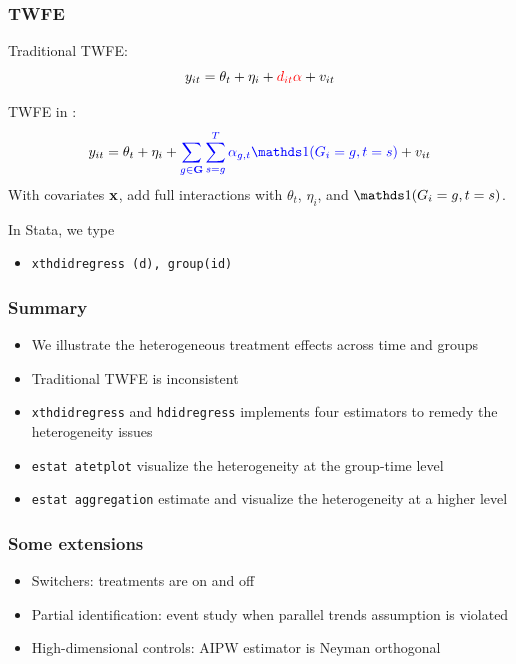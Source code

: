 \documentclass[11pt]{beamer}
\begin{document}
\begin{frame}
  \frametitle{TWFE}
Traditional TWFE:
$$
y_{it} = \theta_t + \eta_i +  {\color{red}{d_{it} \alpha}} + v_{it}
$$


\vskip 1cm
TWFE in \cite{Wooldridge2021}:
$$
	y_{it} = \theta_t + \eta_i +
	\myblue{\sum_{g\in\G}\sum_{s=g}^T\alpha_{g,t} \I(G_i = g, t = s)}
	+ v_{it}
$$
With covariates $\mathbf{x}$, add full interactions with $\theta_t$, $\eta_i$, and
$\I(G_i =g, t= s)$. 

\vskip 0.5cm
In Stata, we type
\begin{itemize}
\item {\large \tt xthdidregress  
  (d), group(id)}
\end{itemize}
\end{frame}

\begin{frame}
\frametitle{Summary}
\begin{itemize}
    \setlength\itemsep{1em}
\item We illustrate the heterogeneous treatment effects across time and groups
\item Traditional TWFE is inconsistent 
\item {\tt xthdidregress} and {\tt hdidregress} implements four estimators to
remedy the heterogeneity issues
\item {\tt estat atetplot} visualize the heterogeneity at the group-time level
\item {\tt estat aggregation} estimate and visualize the heterogeneity at a 
higher level 
\end{itemize}
\end{frame}

\begin{frame}
\frametitle{Some extensions}
\begin{itemize}
  \item Switchers: treatments are on and off \citep{Chaise2020}
\item Partial identification: event study when parallel trends assumption is
  violated \citep{Rambachan2023}
\item High-dimensional controls: AIPW estimator is Neyman orthogonal
  \citep{Callaway2023}
\end{itemize}
\end{frame}
\end{document}
